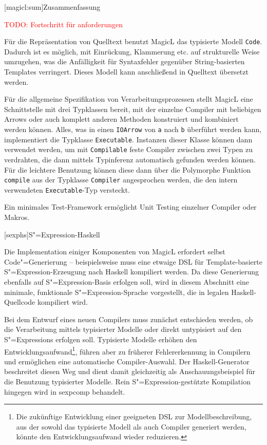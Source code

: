 \documentclass[12pt, a4paper, bibgerm]{scrbook}
\newcommand\icode[1]{\lstinline?#1?}
\newcommand{\todo}[1]{
  \textcolor{red}{TODO: #1}
}
\newcommand\lchapter{}
\newcommand\lsection{}
\newcommand\cref{}
\newcommand{\sexp}{S"=Expression}
\newcommand{\sexps}{S"=Expressions}
\newcommand{\cgen}{Code"=Generierung}
\begin{document}
\lsection[magicl:sum]{Zusammenfassung}

\todo{Fortschritt für anforderungen}

Für die Repräsentation von Quelltext benutzt MagicL das typisierte
Modell \icode{Code}. Dadurch ist es möglich, mit Einrückung, Klammerung
etc. auf strukturelle Weise umzugehen, was die Anfälligkeit für
Syntaxfehler gegenüber String-basierten Templates verringert. Dieses
Modell kann anschließend in Quelltext übersetzt werden.

Für die allgemeine Spezifikation von Verarbeitungsprozessen stellt
MagicL eine Schnittstelle mit drei Typklassen bereit, mit der einzelne
Compiler mit beliebigen Arrows oder auch komplett anderen Methoden
konstruiert und kombiniert werden können. Alles, was in einen
\icode{IOArrow} von \icode{a} nach \icode{b} überführt werden kann,
implementiert die Typklasse \icode{Executable}. Instanzen dieser Klasse
können dann verwendet werden, um mit \icode{Compilable} feste Compiler
zwischen zwei Typen zu verdrahten, die dann mittels Typinferenz
automatisch gefunden werden können. Für die leichtere Benutzung können
diese dann über die Polymorphe Funktion \icode{compile} aus der
Typklasse \icode{Compiler} angesprochen werden, die den intern
verwendeten \icode{Executable}-Typ versteckt.

Ein minimales Test-Framework ermöglicht Unit Testing einzelner Compiler
oder Makros.

\lchapter[sexphs]{\sexp{}-Haskell}

Die Implementation einiger Komponenten von MagicL erfordert selbst
\cgen{} -- beispielsweise muss eine etwaige DSL für Template-basierte
\sexp{}-Erzeugung nach Haskell kompiliert werden. Da diese Generierung
ebenfalls auf \sexp{}-Basis erfolgen soll, wird in diesem Abschnitt
eine minimale, funktionale \sexp{}-Sprache vorgestellt, die in legalen
Haskell-Quellcode kompiliert wird.

Bei dem Entwurf eines neuen Compilers muss zunächst entschieden
werden, ob die Verarbeitung mittels typisierter Modelle oder direkt
untypisiert auf den \sexps{} erfolgen soll. Typisierte Modelle erhöhen
den Entwicklungsaufwand\footnote{Die zukünftige Entwicklung einer
  geeigneten DSL zur Modellbeschreibung, aus der sowohl das typisierte
  Modell als auch Compiler generiert werden, könnte den
  Entwicklungsaufwand wieder reduzieren.}, führen aber zu früherer
Fehlererkennung in Compilern und ermöglichen eine automatische
Compiler-Auswahl. Der Haskell-Generator beschreitet diesen Weg und
dient damit gleichzeitig als Anschauungsbeispiel für die Benutzung
typisierter Modelle. Rein \sexp{}-gestützte Kompilation hingegen wird
in \cref{sexpcomp} behandelt.
\end{document}
